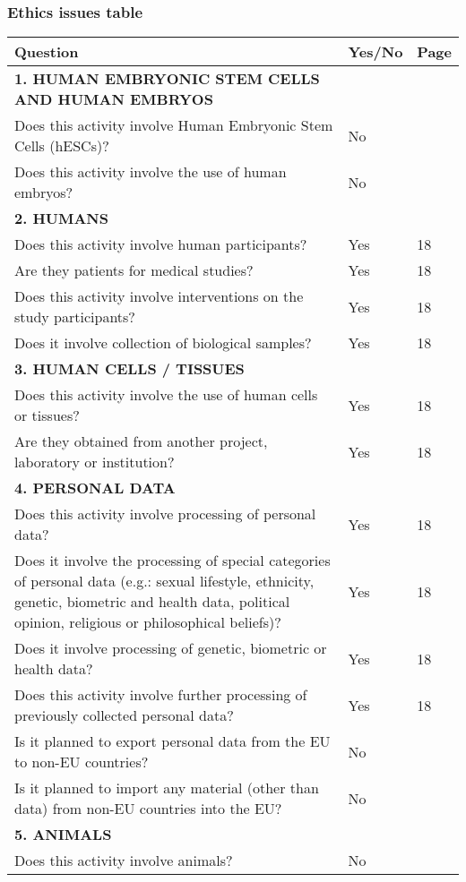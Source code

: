 \documentclass[11pt, a4paper]{article}
\begin{document}
\subsubsection*{Ethics issues table}
\begin{tabular}{p{} p{} p{}}
\toprule
\textbf{Question} & \textbf{Yes/No} & \textbf{Page} \\
\midrule
\textbf{1. HUMAN EMBRYONIC STEM CELLS AND HUMAN EMBRYOS} & & \\
Does this activity involve Human Embryonic Stem Cells (hESCs)? & No & \\
Does this activity involve the use of human embryos? & No & \\
\midrule
\textbf{2. HUMANS} & & \\
Does this activity involve human participants? & Yes & 18 \\
Are they patients for medical studies? & Yes & 18 \\
Does this activity involve interventions on the study participants? & Yes & 18 \\
Does it involve collection of biological samples? & Yes & 18 \\
\midrule
\textbf{3. HUMAN CELLS / TISSUES} & & \\
Does this activity involve the use of human cells or tissues? & Yes & 18 \\
Are they obtained from another project, laboratory or institution? & Yes & 18 \\
\midrule
\textbf{4. PERSONAL DATA} & & \\
Does this activity involve processing of personal data? & Yes & 18 \\
Does it involve the processing of special categories of personal data (e.g.: sexual lifestyle, ethnicity, genetic, biometric and health data, political opinion, religious or philosophical beliefs)? & Yes & 18 \\
Does it involve processing of genetic, biometric or health data? & Yes & 18 \\
Does this activity involve further processing of previously collected personal data? & Yes & 18 \\
Is it planned to export personal data from the EU to non-EU countries? & No & \\
Is it planned to import any material (other than data) from non-EU countries into the EU? & No & \\
\midrule
\textbf{5. ANIMALS} & & \\
Does this activity involve animals? & No & \\

\end{tabular}
\end{document}
